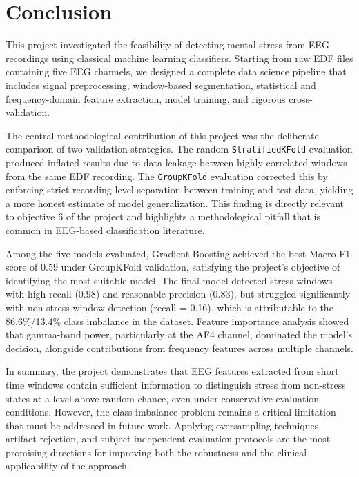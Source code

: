 \documentclass[12pt,a4paper]{article}
\begin{document}
	\section{Conclusion}

	This project investigated the feasibility of detecting mental stress from EEG recordings using classical machine learning classifiers. Starting from raw EDF files containing five EEG channels, we designed a complete data science pipeline that includes signal preprocessing, window-based segmentation, statistical and frequency-domain feature extraction, model training, and rigorous cross-validation.

	The central methodological contribution of this project was the deliberate comparison of two validation strategies. The random \texttt{StratifiedKFold} evaluation produced inflated results due to data leakage between highly correlated windows from the same EDF recording. The \texttt{GroupKFold} evaluation corrected this by enforcing strict recording-level separation between training and test data, yielding a more honest estimate of model generalization. This finding is directly relevant to objective 6 of the project and highlights a methodological pitfall that is common in EEG-based classification literature.

	Among the five models evaluated, Gradient Boosting achieved the best Macro F1-score of 0.59 under GroupKFold validation, satisfying the project's objective of identifying the most suitable model. The final model detected stress windows with high recall (0.98) and reasonable precision (0.83), but struggled significantly with non-stress window detection (recall = 0.16), which is attributable to the 86.6\%/13.4\% class imbalance in the dataset. Feature importance analysis showed that gamma-band power, particularly at the AF4 channel, dominated the model's decision, alongside contributions from frequency features across multiple channels.

	In summary, the project demonstrates that EEG features extracted from short time windows contain sufficient information to distinguish stress from non-stress states at a level above random chance, even under conservative evaluation conditions. However, the class imbalance problem remains a critical limitation that must be addressed in future work. Applying oversampling techniques, artifact rejection, and subject-independent evaluation protocols are the most promising directions for improving both the robustness and the clinical applicability of the approach.
	
\end{document}
